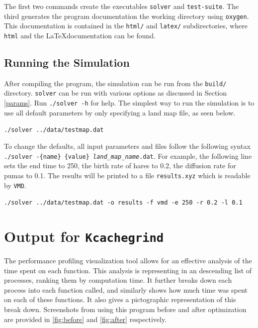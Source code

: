 \documentclass[a4paper,11pt]{article}
\begin{document}
\begin{appendices}
The first two commands create the executables \texttt{solver} and \texttt{test-suite}.   The third generates the program documentation the working directory using \texttt{oxygen}. This documentation is contained in the \texttt{html/} and \texttt{latex/} subdirectories, where \texttt{html} and the \LaTeX documentation can be found. 

\subsection{Running the Simulation}\label{syntax}

After compiling the program, the simulation can be run from the \texttt{build/} directory. \texttt{solver} can be run with various options as discussed in Section \ref{params}. Run \texttt{./solver -h} for help. The simplest way to run the simulation is to use all default parameters by only specifying a land map file, as seen below.

\vspace{5pt}
\noindent\texttt{./solver ../data/testmap.dat}
\vspace{5pt}

To change the defaults, all input parameters and files follow the following syntax \texttt{./solver -\{name\} \{value\} \emph{land\_map\_name}.dat}.  For example, the following line sets the end time to 250, the birth rate of hares to 0.2, the diffusion rate for pumas to 0.1.  The results will be printed to a file \texttt{results.xyz} which is readable by \texttt{VMD}.

\vspace{5pt}
\noindent\texttt{./solver ../data/testmap.dat -o results -f vmd -e 250 -r 0.2 -l 0.1}
\vspace{5pt}





\newpage
\section{Output for \texttt{Kcachegrind}}\label{Kcashegrind} 

The performance profiling visualization tool \label{Kcashegrind} allows for an effective analysis of the time spent on each function.  This analysis is representing in an descending list of processes, ranking them by computation time.  It further breaks down each process into each function called, and similarly shows how much time was spent on each of these functions.  It also gives a pictographic representation of this break down.  Screenshots from using this program before and after optimization are provided in \ref{fig:before} and \ref{fig:after} respectively.  


\end{appendices}
\end{document}
